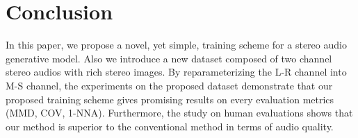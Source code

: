\section{Conclusion}
\label{sec:conclusion}
In this paper, we propose a novel, yet simple, training scheme for a stereo audio generative model. Also we introduce a new dataset composed of two channel stereo audios with rich stereo images. By reparameterizing the L-R channel into M-S channel, the experiments on the proposed dataset demonstrate that our proposed training scheme gives promising results on every evaluation metrics (MMD, COV, 1-NNA). Furthermore, the study on human evaluations shows that our method is superior to the conventional method in terms of audio quality.